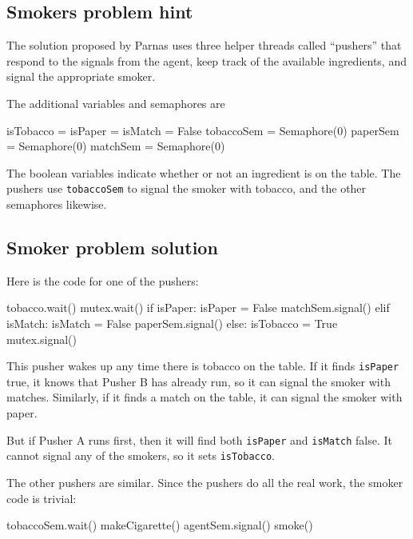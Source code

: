 \documentclass{book}
\begin{document}
\subsection{Smokers problem hint}

The solution proposed by Parnas uses three helper threads
called ``pushers'' that respond to the signals from the agent,
keep track of the available ingredients, and signal the
appropriate smoker.

The additional variables and semaphores are

\begin{unbreakable}[title={Smokers problem hint}]{}
isTobacco = isPaper = isMatch = False
tobaccoSem = Semaphore(0)
paperSem = Semaphore(0)
matchSem = Semaphore(0)
\end{unbreakable}

The boolean variables indicate whether or not an ingredient
is on the table.  The pushers use {\tt tobaccoSem} to signal
the smoker with tobacco, and the other semaphores likewise.



\subsection{Smoker problem solution}

Here is the code for one of the pushers:

\begin{unbreakable}[title={Pusher A}]{}
tobacco.wait()
mutex.wait()
    if isPaper:
        isPaper = False
        matchSem.signal()
    elif isMatch:
        isMatch = False
        paperSem.signal()
    else: 
        isTobacco = True
mutex.signal()
\end{unbreakable}

This pusher wakes up any time there is tobacco on the
table.  If it finds {\tt isPaper} true, it knows that
Pusher B has already run, so it can signal the smoker
with matches.  Similarly, if it finds a match on the
table, it can signal the smoker with paper.

But if Pusher A runs first, then it will find both
    {\tt isPaper} and {\tt isMatch} false.  It cannot signal
any of the smokers, so it sets {\tt isTobacco}.

The other pushers are similar.  Since the pushers do all
the real work, the smoker code is trivial:

\pagebreak
\begin{unbreakable}[title={Smoker with tobacco}]{}
tobaccoSem.wait()
makeCigarette()
agentSem.signal()
smoke()
\end{unbreakable}
\end{document}
